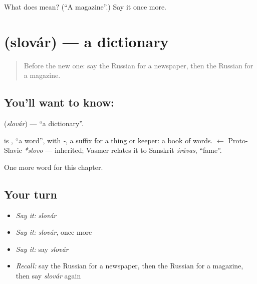 \begin{tcolorbox}[breakable,colback=teal!4,colframe=teal!35!black,title={Before you move on}]
What does  mean? (\textquotedblleft{}A magazine\textquotedblright{}.) Say it once more.
\end{tcolorbox}
\section[\texorpdfstring{\ru{словарь} (slovár)}{словарь (slovár)}]{ (slovár) — a dictionary}

\label{lesson:RU-C192-slovar}



\begin{quote}
Before the new one: say the Russian for a newspaper, then the Russian for a magazine.
\end{quote}

\subsection*{You'll want to know: }
\textbf{} (\emph{slovár}) — \textquotedblleft{}a dictionary\textquotedblright{}.

\begin{cousinweb}
\textbf{} is \emph{}, \textquotedblleft{}a word\textquotedblright{}, with \emph{-}, a suffix for a thing or keeper: a book of words. \emph{} $\leftarrow$ Proto-Slavic \emph{*slovo} — inherited; Vasmer relates it to Sanskrit \emph{śrávas}, \textquotedblleft{}fame\textquotedblright{}.
\end{cousinweb}

\begin{grammarlens}[title={What you've built}]
One more word for this chapter.
\end{grammarlens}

\subsection*{Your turn}
\begin{itemize}
\raggedright
  \item \emph{Say it:} \emph{slovár}
  \item \emph{Say it:} \emph{slovár}, once more
  \item \emph{Say it:} say \emph{slovár}
  \item \emph{Recall:} say the Russian for a newspaper, then the Russian for a magazine, then say \emph{slovár} again
\end{itemize}

